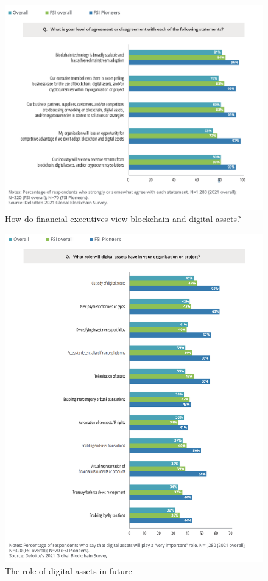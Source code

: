 \documentclass[MSE,Master,english]{twbook}%
\begin{document}
\begin{figure}[H]
  \centering
  \includegraphics[width=\textwidth]{fsi_digital_assets.png}
  \caption{How do financial executives view blockchain and digital assets? \cite{blockchainSurvey}}
  \label{fig:fsi_digital_assets}
\end{figure}

\begin{figure}[H]
  \centering
  \includegraphics[width=\textwidth]{digital_assets_role.png}
  \caption{The role of digital assets in future \cite{blockchainSurvey}}
  \label{fig:digital_assets_role}
\end{figure}
\end{document}
